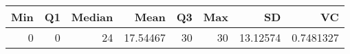 
\begin{tabular}[t]{rrrrrrrr}
\toprule
Min & Q1 & Median & Mean & Q3 & Max & SD & VC\\
\midrule
0 & 0 & 24 & 17.54467 & 30 & 30 & 13.12574 & 0.7481327\\
\bottomrule
\end{tabular}
